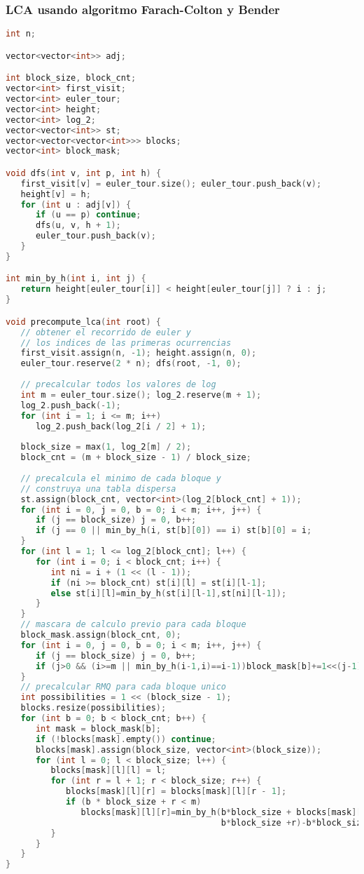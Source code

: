 \subsubsection{LCA usando algoritmo Farach-Colton y Bender}
\begin{lstlisting}[language=C++]
int n;

vector<vector<int>> adj;

int block_size, block_cnt;
vector<int> first_visit;
vector<int> euler_tour;
vector<int> height;
vector<int> log_2;
vector<vector<int>> st;
vector<vector<vector<int>>> blocks;
vector<int> block_mask;

void dfs(int v, int p, int h) {
   first_visit[v] = euler_tour.size(); euler_tour.push_back(v);
   height[v] = h;
   for (int u : adj[v]) {
      if (u == p) continue;
      dfs(u, v, h + 1);
      euler_tour.push_back(v);
   }
}

int min_by_h(int i, int j) {
   return height[euler_tour[i]] < height[euler_tour[j]] ? i : j;
}

void precompute_lca(int root) {
   // obtener el recorrido de euler y 
   // los indices de las primeras ocurrencias
   first_visit.assign(n, -1); height.assign(n, 0);
   euler_tour.reserve(2 * n); dfs(root, -1, 0);
	
   // precalcular todos los valores de log
   int m = euler_tour.size(); log_2.reserve(m + 1);
   log_2.push_back(-1);
   for (int i = 1; i <= m; i++)
      log_2.push_back(log_2[i / 2] + 1);
	
   block_size = max(1, log_2[m] / 2); 
   block_cnt = (m + block_size - 1) / block_size;
	
   // precalcula el minimo de cada bloque y 
   // construya una tabla dispersa
   st.assign(block_cnt, vector<int>(log_2[block_cnt] + 1));
   for (int i = 0, j = 0, b = 0; i < m; i++, j++) {
      if (j == block_size) j = 0, b++;
      if (j == 0 || min_by_h(i, st[b][0]) == i) st[b][0] = i;
   }
   for (int l = 1; l <= log_2[block_cnt]; l++) {
      for (int i = 0; i < block_cnt; i++) {
         int ni = i + (1 << (l - 1));
         if (ni >= block_cnt) st[i][l] = st[i][l-1];
         else st[i][l]=min_by_h(st[i][l-1],st[ni][l-1]);
      }
   }
   // mascara de calculo previo para cada bloque
   block_mask.assign(block_cnt, 0);
   for (int i = 0, j = 0, b = 0; i < m; i++, j++) {
      if (j == block_size) j = 0, b++;
      if (j>0 && (i>=m || min_by_h(i-1,i)==i-1))block_mask[b]+=1<<(j-1);
   }
   // precalcular RMQ para cada bloque unico
   int possibilities = 1 << (block_size - 1);
   blocks.resize(possibilities);
   for (int b = 0; b < block_cnt; b++) {
      int mask = block_mask[b];
      if (!blocks[mask].empty()) continue;
      blocks[mask].assign(block_size, vector<int>(block_size));
      for (int l = 0; l < block_size; l++) {
         blocks[mask][l][l] = l;
         for (int r = l + 1; r < block_size; r++) {
            blocks[mask][l][r] = blocks[mask][l][r - 1];
            if (b * block_size + r < m) 
               blocks[mask][l][r]=min_by_h(b*block_size + blocks[mask][l][r],
                                           b*block_size +r)-b*block_size;
         }
      }
   }
}


\end{lstlisting}
